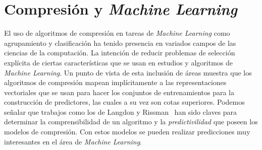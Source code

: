 
\chapter[Compresión y Machine Learning]{Compresión y \emph{Machine Learning}}
\label{ch:Compresion-Machine-Learning}








El uso de algoritmos de compresión en tareas de \emph{Machine Learning} como agrupamiento y clasificación ha tenido presencia en variados campos de las ciencias de la computación. La intención de reducir problemas de selección explícita de ciertas características que se usan en estudios y algoritmos de \emph{Machine Learning}.
Un punto de vista de esta inclusión de áreas muestra que los algoritmos de compresión mapean implícitamente a las representaciones vectoriales que se usan para hacer los conjuntos de entrenamientos para la construcción de predictores, las cuales a su vez son cotas superiores. Podemos señalar que  trabajos como los de Langdon y Rissman~\cite{RissanenLangdon1979} han sido claves para determinar la comprensibilidad de un algoritmo y la \emph{predictivilidad} que poseen los modelos de compresión. Con estos modelos se pueden realizar predicciones muy interesantes en el área de \emph{Machine Learning}.









